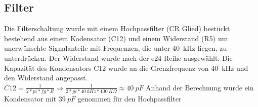 \subsection{Filter}%
Die Filterschaltung wurde mit einem Hochpassfilter (CR Glied) bestückt bestehend aus einem Kodensator (C12) und einem Widerstand (R5) um unerwünschte Signalanteile mit Frequenzen, die unter 40~kHz liegen, zu unterdrücken. Der Widerstand wurde nach der e24 Reihe ausgewählt.
Die Kapazität des Kondensators C12 wurde an die Grenzfrequenz von 40~kHz und den Widerstand angepasst.
\onehalfspacing \\
\(\displaystyle C12=\frac{1}{2*pi*fg*R}\Rightarrow\frac{1}{2*pi*40~kHz*100~K\Omega}\approx40~pF \)
\singlespacing
Anhand der Berechnung wurde ein Kondensator mit \(\displaystyle 39~pF\) genommen für den Hochpassfilter

